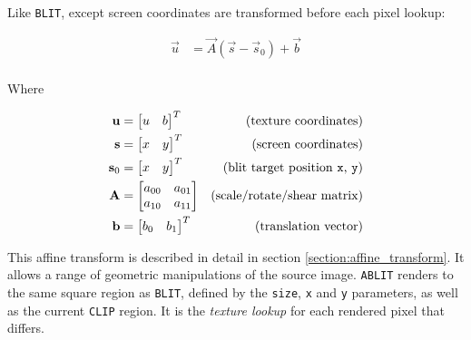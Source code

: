 Like {\tt BLIT}, except screen coordinates are transformed before each pixel lookup:

\begin{align*}
\vec{u}   &= \vec{A}(\vec{s} - \vec{s}_0) + \vec{b} \\
\end{align*}

Where

\begin{align*}
\vec{u}   &= \begin{bmatrix}u & b \\ \end{bmatrix}^T & \textup{(texture coordinates)} \\
\vec{s}   &= \begin{bmatrix}x & y \\ \end{bmatrix}^T & \textup{(screen coordinates)} \\
\vec{s}_0 &= \begin{bmatrix}x & y \\ \end{bmatrix}^T & \textup{(blit target position {\tt x}, {\tt y})} \\
\vec{A}   &= \begin{bmatrix}a_{00} & a_{01} \\ a_{10} & a_{11} \end{bmatrix} & \textup{(scale/rotate/shear matrix)} \\
\vec{b}   &= \begin{bmatrix}b_0 & b_1 \\ \end{bmatrix}^T & \textup{(translation vector)} \\
\end{align*}

This affine transform is described in detail in section \ref{section:affine_transform}. It allows a range of geometric manipulations of the source image. {\tt ABLIT} renders to the same square region as {\tt BLIT}, defined by the {\tt size}, {\tt x} and {\tt y} parameters, as well as the current {\tt CLIP} region. It is the {\it texture lookup} for each rendered pixel that differs.

